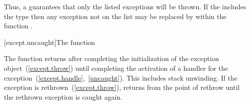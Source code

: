 \pnum
Thus,
a 
guarantees that only the listed exceptions will be thrown.
If the
includes the type
then any exception not on the list may be replaced by
within the function
.

[except.uncaught]{The  function}%

\pnum
The function
returns
after completing
the initialization of the exception object~(\ref{except.throw})
until completing
the
activation of a handler for the exception~(\ref{except.handle},~\ref{uncaught}).
This includes stack unwinding.
If the exception is rethrown~(\ref{except.throw}),
returns
from the point of rethrow until the rethrown exception is caught again.%

